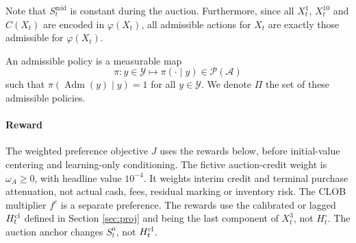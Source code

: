 \documentclass[11pt]{article}
\begin{document}
\begin{remark}
    Note that $S_t^\mathrm{mid}$ is constant during the auction. Furthermore, since all $X_t^1$, $X_t^{10}$ and $C(X_t)$ are encoded in $\varphi(X_t)$, all admissible actions for $X_t$ are exactly those admissible for $\varphi(X_t)$.
\end{remark}

\begin{definition}
    An admissible policy is a measurable map \[\pi\colon y\in \mathcal{Y} \longmapsto \pi(\cdot \mid y) \in \mathcal{P}(\mathcal{A})\]
    such that $\pi(\operatorname{Adm}(y)\mid y)=1$ for all $y \in \mathcal{Y}$. We denote $\Pi$ the set of these admissible policies.
\end{definition}

\paragraph{Reward} {The weighted preference objective $J$ uses the rewards below, before initial-value centering and learning-only conditioning. The fictive auction-credit weight is $\omega_A\geqslant0$, with headline value $10^{-4}$. It weights interim credit and terminal purchase attenuation, not actual cash, fees, residual marking or inventory risk. The CLOB multiplier $f^c$ is a separate preference.} {The rewards use the calibrated or lagged $H_t^{\mathrm{cl}}$ defined in Section \ref{sec:proj} and being the last component of $X_t^3$, not $H_t^\circ$. The auction anchor changes $S_t^a$, not $H_t^{\mathrm{cl}}$.}
\end{document}
